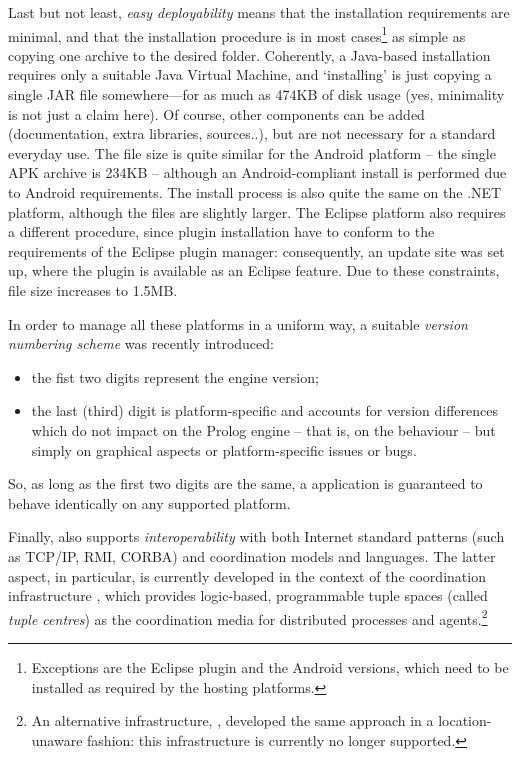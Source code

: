 Last but not least, \textit{easy deployability} means that the installation requirements are minimal, and that the installation procedure is in most cases\footnote{Exceptions are the Eclipse plugin and the Android versions, which need to be installed as required by the hosting platforms.} as simple as copying one archive to the desired folder.
%
Coherently, a Java-based installation requires only a suitable Java Virtual Machine, and `installing' is just copying a single JAR file somewhere---for as much as 474KB of disk usage (yes, minimality is not just a claim here).
%
Of course, other components can be added (documentation, extra libraries, sources..), but are not necessary for a standard everyday use.
%
The file size is quite similar for the Android platform -- the single APK archive is 234KB -- although an Android-compliant install is performed due to Android requirements.
%
The install process is also quite the same on the .NET platform, although the files are slightly larger.
%
The Eclipse platform also requires a different procedure, since plugin installation have to conform to the requirements of the Eclipse plugin manager: consequently, an update site was set up, where the \tuprolog{} plugin is available as an Eclipse feature. Due to these constraints, file size increases to 1.5MB.


In order to manage all these platforms in a uniform way, a suitable \emph{version numbering scheme} was recently introduced:
\begin{itemize}
  \item the fist two digits represent the engine version;
  \item the last (third) digit is platform-specific and accounts for version differences which do not impact on the Prolog engine -- that is, on the
      \tuprolog{} behaviour -- but simply on graphical aspects or platform-specific
      issues or bugs.
\end{itemize}
%
So, as long as the first two digits are the same, a \tuprolog{} application is guaranteed to behave identically on any supported platform.


Finally, \tuprolog{} also supports \textit{interoperability} with both Internet standard patterns (such as TCP/IP, RMI, CORBA) and coordination models and languages.
%
The latter aspect, in particular, is currently developed in the context of the \tucson{} coordination infrastructure \cite{tucson-aamas99,respect-scico2001}, which provides logic-based, programmable tuple spaces (called \emph{tuple centres}) as the coordination media for distributed processes and agents.\footnote{An alternative infrastructure, \luce{} \cite{luce-aamas2001}, developed the same approach in a location-unaware fashion: this infrastructure is currently no longer supported.}


